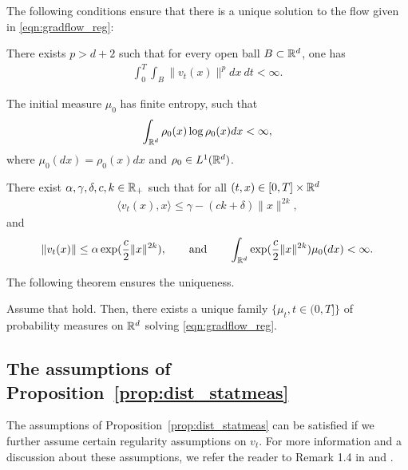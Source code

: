 The following conditions ensure that there is a unique solution to the flow given in \eqref{eqn:gradflow_reg}:
\begin{assumption}
\label{asmp:flowunq_1}
There exists $p>d+2$ such that for every open ball $B \subset \mathbb{R}^d$, one has
\begin{align}
\int_0^T \int_B \|v_t(x)\|^p dx\> dt < \infty.
\end{align}
\end{assumption}
%
\begin{assumption}
\label{asmp:flowunq_2}
The initial measure $\mu_0$ has finite entropy, such that
\begin{align}
\int_{\mathbb{R}^d} \rho_0(x) \log \rho_0(x) dx < \infty,
\end{align}
where $\mu_0(dx) = \rho_0(x)dx$ and $\rho_0 \in L^1(\mathbb{R}^d)$.
\end{assumption}
%
\begin{assumption}
\label{asmp:flowunq_3}
There exist $\alpha, \gamma, \delta, c, k \in \mathbb{R}_+$ such that for all $(t,x) \in [0,T] \times \mathbb{R}^d$ 
\begin{align}
\langle v_t(x), x \rangle \leq \gamma - (ck + \delta) \| x\|^{2k},
\end{align}
and 
\begin{align}
\label{asmp:flowunq_4}
\|v_t(x)\| \leq \alpha \exp(\frac{c}{2} \|x\|^{2k}), \qquad \text{and} \qquad \int_{\mathbb{R}^d} \exp(\frac{c}{2}\|x\|^{2k} ) \mu_0(dx) < \infty.
\end{align}
\end{assumption}

The following theorem ensures the uniqueness.
\begin{thm}
Assume that  hold. Then, there exists a unique family $\{\mu_t, t\in(0,T]\}$ of probability measures on $\mathbb{R}^d$ solving \eqref{eqn:gradflow_reg}.
\end{thm}

\subsection{The assumptions of Proposition~\ref{prop:dist_statmeas}}

The assumptions of Proposition~\ref{prop:dist_statmeas} can be satisfied if we further assume certain regularity assumptions on $v_t$. For more information and a discussion about these assumptions, we refer the reader to Remark 1.4 in \cite{bogachev2016distances} and \cite{bogachev2006global,bogachev2008estimates}.


